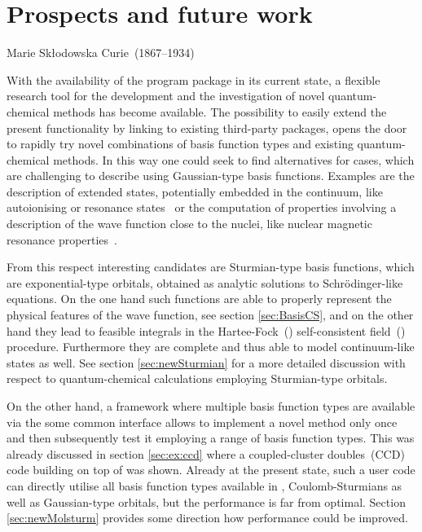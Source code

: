 \chapter{Prospects and future work}
\label{ch:Prospects}
{Marie Skłodowska Curie~(1867--1934)}

\noindent
With the availability of the \molsturm program package in its
current state, a flexible research tool
for the development and the investigation of novel quantum-chemical methods
has become available.
The possibility to easily extend the present functionality
by linking to existing third-party packages,
opens the door to rapidly try novel combinations of basis function types
and existing quantum-chemical methods.
In this way one could seek to find alternatives for cases,
which are challenging to describe using Gaussian-type basis functions.
Examples are the description of extended states,
potentially embedded in the continuum,
like autoionising or resonance states~\cite{Feshbach1958,Feshbach1962,Riss1993,Santra2002}
or the computation of properties involving a description
of the wave function close to the nuclei,
like nuclear magnetic resonance properties~\cite{Guell2008,Hoggan2009}.

From this respect interesting candidates are Sturmian-type basis functions,
which are exponential-type orbitals,
obtained as analytic solutions to Schrödinger-like equations.
On the one hand such functions are able to properly represent
the physical features of the wave function,
see section \ref{sec:BasisCS},
and on the other hand they lead to feasible integrals
in the Hartee-Fock~(\HF) self-consistent field~(\SCF) procedure.
Furthermore they are complete
and thus able to model continuum-like states as well.
See section \ref{sec:newSturmian} for a more
detailed discussion with respect to
quantum-chemical calculations employing Sturmian-type orbitals.

On the other hand, a framework where multiple basis function types
are available via the some common interface allows to
implement a novel method only once and then subsequently
test it employing a range of basis function types.
This was already discussed in section \vref{sec:ex:ccd}
where a coupled-cluster doubles~(CCD) code building on top of \molsturm was shown.
Already at the present state, such a user code can
directly utilise all basis function types available in \molsturm,
\ie Coulomb-Sturmians as well as Gaussian-type orbitals,
but the performance is far from optimal.
Section \ref{sec:newMolsturm} provides some direction
how performance could be improved.

